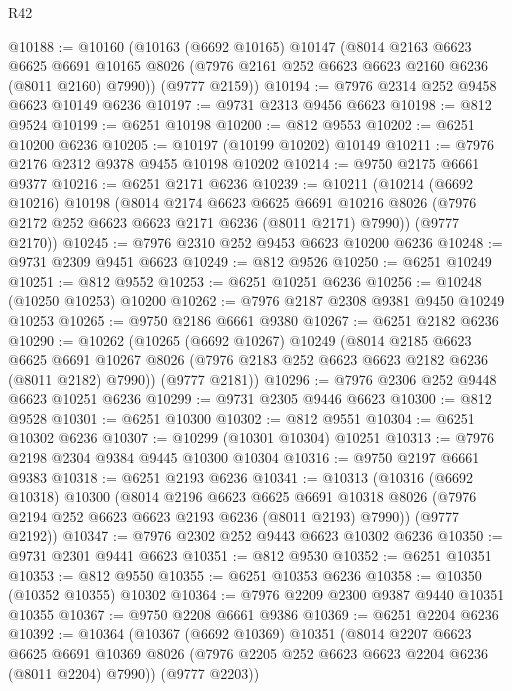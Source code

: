 \begin{lexlean}{R42}
\begin{coremodule}
{@10188 := @10160
    (@10163
      (@6692 @10165)
      @10147
      (@8014
        @2163
        @6623
        @6625
        @6691
        @10165
        @8026
        (@7976 @2161 @252 @6623 @6623 @2160 @6236 (@8011 @2160) @7990))
      (@9777 @2159))
@10194 := @7976 @2314 @252 @9458 @6623 @10149 @6236
@10197 := @9731 @2313 @9456 @6623
@10198 := @812 @9524
@10199 := @6251 @10198
@10200 := @812 @9553
@10202 := @6251 @10200 @6236
@10205 := @10197 (@10199 @10202) @10149
@10211 := @7976 @2176 @2312 @9378 @9455 @10198 @10202
@10214 := @9750 @2175 @6661 @9377
@10216 := @6251 @2171 @6236
@10239 := @10211
    (@10214
      (@6692 @10216)
      @10198
      (@8014
        @2174
        @6623
        @6625
        @6691
        @10216
        @8026
        (@7976 @2172 @252 @6623 @6623 @2171 @6236 (@8011 @2171) @7990))
      (@9777 @2170))
@10245 := @7976 @2310 @252 @9453 @6623 @10200 @6236
@10248 := @9731 @2309 @9451 @6623
@10249 := @812 @9526
@10250 := @6251 @10249
@10251 := @812 @9552
@10253 := @6251 @10251 @6236
@10256 := @10248 (@10250 @10253) @10200
@10262 := @7976 @2187 @2308 @9381 @9450 @10249 @10253
@10265 := @9750 @2186 @6661 @9380
@10267 := @6251 @2182 @6236
@10290 := @10262
    (@10265
      (@6692 @10267)
      @10249
      (@8014
        @2185
        @6623
        @6625
        @6691
        @10267
        @8026
        (@7976 @2183 @252 @6623 @6623 @2182 @6236 (@8011 @2182) @7990))
      (@9777 @2181))
@10296 := @7976 @2306 @252 @9448 @6623 @10251 @6236
@10299 := @9731 @2305 @9446 @6623
@10300 := @812 @9528
@10301 := @6251 @10300
@10302 := @812 @9551
@10304 := @6251 @10302 @6236
@10307 := @10299 (@10301 @10304) @10251
@10313 := @7976 @2198 @2304 @9384 @9445 @10300 @10304
@10316 := @9750 @2197 @6661 @9383
@10318 := @6251 @2193 @6236
@10341 := @10313
    (@10316
      (@6692 @10318)
      @10300
      (@8014
        @2196
        @6623
        @6625
        @6691
        @10318
        @8026
        (@7976 @2194 @252 @6623 @6623 @2193 @6236 (@8011 @2193) @7990))
      (@9777 @2192))
@10347 := @7976 @2302 @252 @9443 @6623 @10302 @6236
@10350 := @9731 @2301 @9441 @6623
@10351 := @812 @9530
@10352 := @6251 @10351
@10353 := @812 @9550
@10355 := @6251 @10353 @6236
@10358 := @10350 (@10352 @10355) @10302
@10364 := @7976 @2209 @2300 @9387 @9440 @10351 @10355
@10367 := @9750 @2208 @6661 @9386
@10369 := @6251 @2204 @6236
@10392 := @10364
    (@10367
      (@6692 @10369)
      @10351
      (@8014
        @2207
        @6623
        @6625
        @6691
        @10369
        @8026
        (@7976 @2205 @252 @6623 @6623 @2204 @6236 (@8011 @2204) @7990))
      (@9777 @2203))
}
\end{coremodule}
\end{lexlean}
